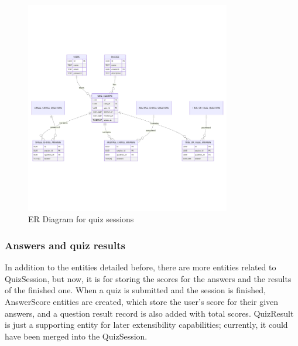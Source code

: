 \begin{figure}[H]
    \centering
    \includegraphics[width=0.8\textwidth, keepaspectratio]{figures/er-quiz-sessions.png}
    \caption{ER Diagram for quiz sessions}
    \label{fig:er-quiz-session}
\end{figure}

\subsubsection{Answers and quiz results}

In addition to the entities detailed before, there are more entities related to QuizSession, but now, it is for storing the scores for the answers and the results of the finished one. When a quiz is submitted and the session is finished, AnswerScore entities are created, which store the user's score for their given answers, and a question result record is also added with total scores. QuizResult is just a supporting entity for later extensibility capabilities; currently, it could have been merged into the QuizSession. 

